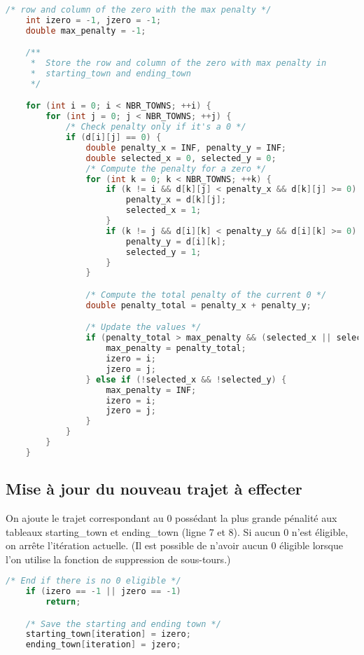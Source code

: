 \documentclass[a4paper]{article}
\begin{document}
\begin{lstlisting}[language=C]
    /* row and column of the zero with the max penalty */
    int izero = -1, jzero = -1;
    double max_penalty = -1;

    /**
     *  Store the row and column of the zero with max penalty in
     *  starting_town and ending_town
     */

    for (int i = 0; i < NBR_TOWNS; ++i) {
        for (int j = 0; j < NBR_TOWNS; ++j) {
            /* Check penalty only if it's a 0 */
            if (d[i][j] == 0) {
                double penalty_x = INF, penalty_y = INF;
                double selected_x = 0, selected_y = 0;
                /* Compute the penalty for a zero */
                for (int k = 0; k < NBR_TOWNS; ++k) {
                    if (k != i && d[k][j] < penalty_x && d[k][j] >= 0) {
                        penalty_x = d[k][j];
                        selected_x = 1;
                    }
                    if (k != j && d[i][k] < penalty_y && d[i][k] >= 0) {
                        penalty_y = d[i][k];
                        selected_y = 1;
                    }
                }

                /* Compute the total penalty of the current 0 */
                double penalty_total = penalty_x + penalty_y;

                /* Update the values */
                if (penalty_total > max_penalty && (selected_x || selected_y)) {
                    max_penalty = penalty_total;
                    izero = i;
                    jzero = j;
                } else if (!selected_x && !selected_y) {
                    max_penalty = INF;
                    izero = i;
                    jzero = j;
                }
            }
        }
    }
\end{lstlisting}

\subsection{Mise à jour du nouveau trajet à effecter}

On ajoute le trajet correspondant au 0 possédant la plus grande pénalité aux tableaux starting\_town et ending\_town (ligne 7 et 8).
Si aucun 0 n'est éligible, on arrête l'itération actuelle. (Il est possible de n'avoir aucun 0 éligible lorsque l'on utilise la fonction de suppression de sous-tours.)

\begin{lstlisting}[language=C]
    /* End if there is no 0 eligible */
    if (izero == -1 || jzero == -1)
        return;

    /* Save the starting and ending town */
    starting_town[iteration] = izero;
    ending_town[iteration] = jzero;
\end{lstlisting}
\end{document}
